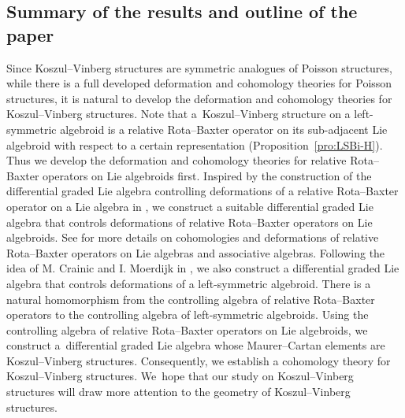 \documentclass[10pt,a4paper]{amsart}
\numberwithin{equation}{section}
\begin{document}
\subsection{Summary of the results and outline of the paper}
Since Koszul--Vinberg structures are symmetric analogues of Poisson structures, while there is a full developed deformation and cohomology theories for Poisson structures, it is natural to develop the deformation and cohomology theories for Koszul--Vinberg structures.
 Note that a~Koszul--Vinberg structure on a left-symmetric algebroid is a relative Rota--Baxter operator on its sub-adjacent Lie algebroid with respect to a certain representation (Proposition~\ref{pro:LSBi-H}). Thus we develop the deformation and cohomology theories for relative Rota--Baxter operators on Lie algebroids first.
Inspired by the construction of the differential graded Lie algebra controlling deformations of a relative Rota--Baxter operator on a Lie algebra in \cite{TBGS}, we construct a suitable differential graded Lie algebra that controls deformations of relative Rota--Baxter operators on Lie algebroids. See \cite{Das,TBGS} for more details on cohomologies and deformations of relative Rota--Baxter operators on Lie algebras and associative algebras. Following the idea of M. Crainic and I. Moerdijk in \cite{deformation-cohomology-LA}, we also construct a differential graded Lie algebra that controls deformations of a left-symmetric algebroid. There is a natural homomorphism from the controlling algebra of relative Rota--Baxter operators to the controlling algebra of left-symmetric algebroids.
\mbox{Using} the controlling algebra of relative Rota--Baxter operators on Lie algebroids, we construct a~differential graded Lie algebra whose Maurer--Cartan elements are Koszul--Vinberg structures. Consequently, we establish a cohomology theory for Koszul--Vinberg structures. We~hope that our study on Koszul--Vinberg structures will draw more attention to the geometry of Koszul--Vinberg structures.
\end{document}

